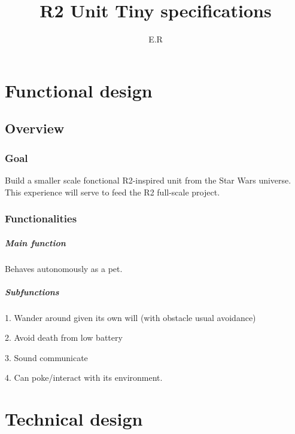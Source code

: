 \documentclass{report}
\title{R2 Unit Tiny specifications}
\author{E.R}
\begin{document}
\maketitle

\tableofcontents

\chapter{Functional design}
\section{Overview}
\subsection{Goal}

Build a smaller scale fonctional R2-inspired unit from the Star Wars universe. This experience will serve to feed the R2 full-scale project.

\subsection{Functionalities}

\paragraph{Main function}
Behaves autonomously as a pet.

\paragraph{Subfunctions}

1. Wander around given its own will (with obstacle usual avoidance)

2. Avoid death from low battery

3. Sound communicate

4. Can poke/interact with its environment.


\chapter{Technical design}
\end{document}
